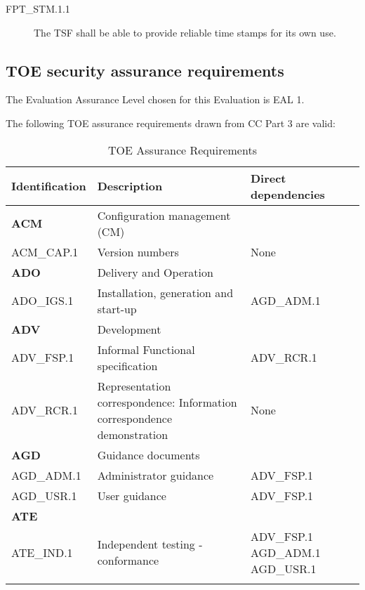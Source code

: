 \documentclass[12pt,english]{scrbook}
\begin{document}



\begin{description}
\item[FPT{\_}STM.1.1]

The TSF shall be able to provide reliable time stamps for its own use.

\end{description}





\subsection{TOE security assurance requirements}

The Evaluation Assurance Level chosen for this Evaluation is EAL 1.

The following TOE assurance requirements drawn from CC Part 3 are valid:


\begin{longtable}[c]{lp{6cm}l}
  \toprule
  Identification & Description & Direct dependencies\\
  \midrule \endhead

  \textbf{ACM} & Configuration management (CM) &  \\
  ACM{\_}CAP.1 & Version numbers & None \\

  \textbf{ADO} & Delivery and Operation &  \\
  ADO{\_}IGS.1 & Installation, generation and start-up & AGD{\_}ADM.1 \\
  
  \textbf{ADV} & Development &  \\
  ADV{\_}FSP.1 & Informal Functional specification & ADV{\_}RCR.1 \\

  ADV{\_}RCR.1 & Representation correspondence: Information correspondence
  demonstration & None \\ 

  \textbf{AGD} & Guidance documents &  \\
  AGD{\_}ADM.1 & Administrator guidance & ADV{\_}FSP.1 \\
  AGD{\_}USR.1 & User guidance & ADV{\_}FSP.1 \\
  \textbf{ATE} &  &  \\ 
  ATE{\_}IND.1 & Independent testing - conformance & ADV{\_}FSP.1 AGD{\_}ADM.1 AGD{\_}USR.1 \\


  \bottomrule
  \caption{TOE Assurance Requirements}
            
\end{longtable}
\end{document}
